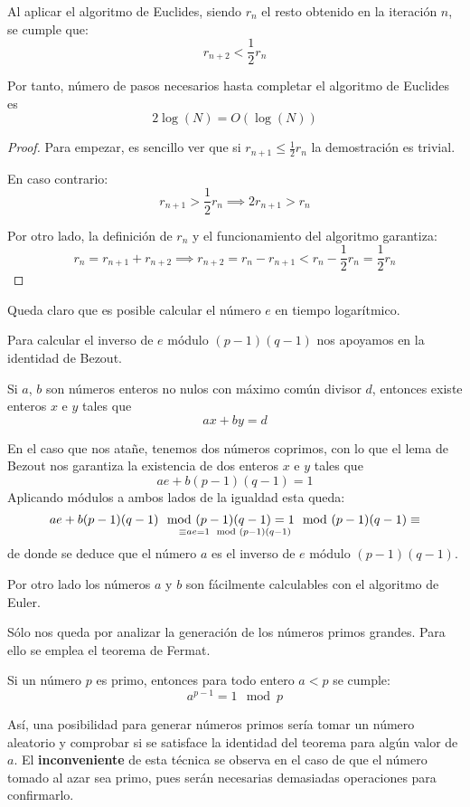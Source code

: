 \documentclass[nochap]{apuntesURJC}
\begin{document}
\begin{lemma}
Al aplicar el algoritmo de Euclides, siendo $r_n$ el resto obtenido en la iteración $n$, se cumple que:
\[r_{n+2} < \frac{1}{2}r_n\]

Por tanto, número de pasos necesarios hasta completar el algoritmo de Euclides es
\[2\log(N)=O(\log(N))\]
\end{lemma}

\begin{proof}
Para empezar, es sencillo ver que si $r_{n+1} \leq \frac{1}{2}r_n$ la demostración es trivial.

En caso contrario:
\[r_{n+1} > \frac{1}{2} r_n \implies 2r_{n+1} > r_n\]

Por otro lado, la definición de $r_n$ y el funcionamiento del algoritmo garantiza:
\[r_n = r_{n+1} + r_{n+2} \implies r_{n+2} = r_n-r_{n+1} < r_n-\frac{1}{2}r_n = \frac{1}{2}r_n\]
\end{proof}

Queda claro que es posible calcular el número $e$ en tiempo logarítmico.

Para calcular el inverso de $e$ módulo $(p-1)(q-1)$ nos apoyamos en la identidad de Bezout.
\begin{lemma}
Si $a$, $b$ son números enteros no nulos con máximo común divisor $d$, entonces existe enteros $x$ e $y$ tales que
\[ax+by=d\]
\end{lemma}

En el caso que nos atañe, tenemos dos números coprimos, con lo que el lema de Bezout nos garantiza la existencia de dos enteros $x$ e $y$ tales que
\[ae + b(p-1)(q-1)=1\]
Aplicando módulos a ambos lados de la igualdad esta queda:
\[ae + b(p-1)(q-1) \mod (p-1)(q-1) = 1 \mod (p-1)(q-1) \equiv\atop \equiv ae = 1 \mod (p-1)(q-1)\]
de donde se deduce que el número $a$ es el inverso de $e$ módulo $(p-1)(q-1)$.

Por otro lado los números $a$ y $b$ son fácilmente calculables con el algoritmo de Euler.

Sólo nos queda por analizar la generación de los números primos grandes. Para ello se emplea el teorema de Fermat.
\begin{theorem}
Si un número $p$ es primo, entonces para todo entero $a < p$ se cumple:
\[a^{p-1}=1 \mod p\]
\end{theorem}

Así, una posibilidad para generar números primos sería tomar un número aleatorio y comprobar si se satisface la identidad del teorema para algún valor de $a$. El \textbf{inconveniente} de esta técnica se observa en el caso de que el número tomado al azar sea primo, pues serán necesarias demasiadas operaciones para confirmarlo.
\end{document}
